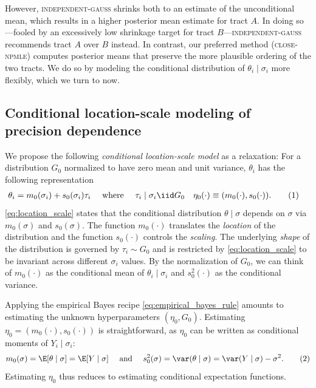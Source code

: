 \documentclass[12pt, reqno]{amsart}
\newcommand\numberthis{\addtocounter{equation}{1}\tag{\theequation}}
\newcommand{\close}{\textsc{close}}
\newcommand{\npmle}{\textsc{npmle}}
\newcommand{\closenpmle}{\close-\npmle}
\newcommand{\indepgauss}{\textsc{independent-gauss}}
\numberwithin{equation}{section}
\begin{document}
However, \indepgauss{} shrinks both to an estimate of the unconditional mean, which
results in a higher posterior mean estimate for tract $A$. In doing so---fooled by an
excessively low shrinkage target for tract $B$---\indepgauss{} recommends tract $A$ over
$B$ instead. In contrast, our preferred method (\closenpmle) computes posterior means that
preserve the more plausible ordering of the two tracts. We do so by modeling the
conditional distribution of $\theta_i
\mid \sigma_i$ more flexibly, which we turn to now.


















\subsection{Conditional location-scale modeling of precision dependence}
\label{sub:close}
We propose the following \emph{conditional location-scale model} as a  relaxation: For a
distribution $G_0$ normalized to have zero mean and unit variance, $\theta_i$ has the
following
representation
\begin{align*}
\theta_i = m_0(\sigma_i) + s_0(\sigma_i) \tau_i &\quad\text{ where }\quad \tau_i \mid \sigma_i \iid
G_0 \quad \eta_0(\cdot) \equiv (m_0(\cdot), s_0(\cdot)) .
\numberthis 
\label{eq:location_scale}
\end{align*}
\eqref{eq:location_scale} states that the conditional distribution $\theta \mid
\sigma$ depends on $\sigma$ via $m_0(\sigma)$ and $s_0(\sigma)$. The function $m_0(\cdot)$
translates the \emph{location} of the distribution and the function $s_0(\cdot)$ controls
the \emph{scaling}. The underlying \emph{shape} of the distribution is governed by $\tau_i
\sim G_0$ and
is restricted by \eqref{eq:location_scale} to be invariant across different $\sigma_i$
values. By the normalization of $G_0$, we can think of $m_0 (\cdot)$ as the
conditional mean of $\theta_i \mid \sigma_i$ and $s_0^2(\cdot)$ as the conditional
variance.






Applying the empirical Bayes recipe \eqref{eq:empirical_bayes_rule} amounts to
estimating the
unknown hyperparameters $(\eta_0, G_0)$. Estimating $\eta_0 = (m_0(\cdot), s_0(\cdot))$ is
 straightforward, as $\eta_0$ can be written as conditional moments
of $Y_i \mid \sigma_i$: \[m_0 (\sigma) = \E[\theta
\mid \sigma] = \E[Y \mid
\sigma]  \quad\text{ and } \quad s_0^2 (\sigma) = \var (\theta \mid \sigma) =
\var(Y\mid \sigma) -
\sigma^2. \numberthis \label{eq:m_s_def}
\]
Estimating $\eta_0$ thus reduces to estimating conditional expectation functions.%
\end{document}

